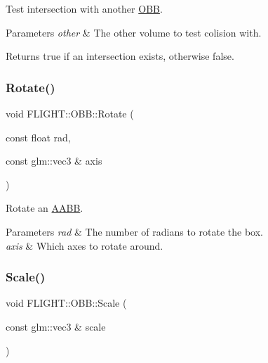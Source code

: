 Test intersection with another \hyperlink{class_f_l_i_g_h_t_1_1_o_b_b}{O\+BB}. 


\begin{DoxyParams}{Parameters}
{\em other} & The other volume to test colision with. \\
\hline
\end{DoxyParams}
\begin{DoxyReturn}{Returns}
true if an intersection exists, otherwise false. 
\end{DoxyReturn}
\mbox{\label{class_f_l_i_g_h_t_1_1_o_b_b_ad6554a26d30c35ca3f25314d735adc5d}} 
\subsubsection{\texorpdfstring{Rotate()}{Rotate()}}
{\footnotesize\ttfamily void F\+L\+I\+G\+H\+T\+::\+O\+B\+B\+::\+Rotate (\begin{DoxyParamCaption}\item[{const float}]{rad,  }\item[{const glm\+::vec3 \&}]{axis }\end{DoxyParamCaption})}



Rotate an \hyperlink{class_f_l_i_g_h_t_1_1_a_a_b_b}{A\+A\+BB}. 


\begin{DoxyParams}{Parameters}
{\em rad} & The number of radians to rotate the box. \\
\hline
{\em axis} & Which axes to rotate around. \\
\hline
\end{DoxyParams}
\mbox{\label{class_f_l_i_g_h_t_1_1_o_b_b_a4c62330309d2812cb03a4da434b39f1e}} 
\subsubsection{\texorpdfstring{Scale()}{Scale()}}
{\footnotesize\ttfamily void F\+L\+I\+G\+H\+T\+::\+O\+B\+B\+::\+Scale (\begin{DoxyParamCaption}\item[{const glm\+::vec3 \&}]{scale }\end{DoxyParamCaption})}



